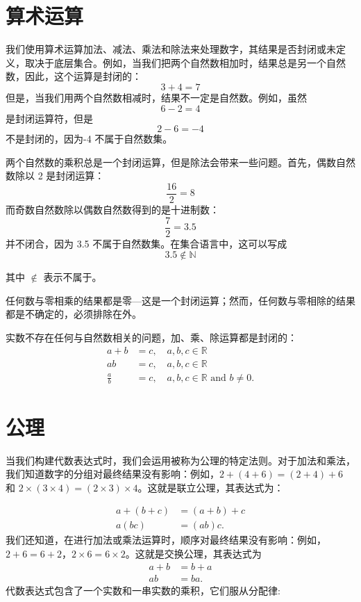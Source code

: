 \section{算术运算}
我们使用算术运算加法、减法、乘法和除法来处理数字，其结果是否封闭或未定义，取决于底层集合。例如，当我们把两个自然数相加时，结果总是另一个自然数，因此，这个运算是封闭的：
$$
    3+4=7
$$
但是，当我们用两个自然数相减时，结果不一定是自然数。例如，虽然
$$
    6-2=4
$$
是封闭运算符，但是
$$
    2-6=-4
$$
不是封闭的，因为-4 不属于自然数集。

两个自然数的乘积总是一个封闭运算，但是除法会带来一些问题。首先，偶数自然数除以 2 是封闭运算：
$$
    \frac{16}{2}=8
$$
而奇数自然数除以偶数自然数得到的是十进制数：
$$
    \frac{7}{2}=3.5
$$
并不闭合，因为 3.5 不属于自然数集。在集合语言中，这可以写成
$$
    3.5 \notin \mathbb{N}
$$

其中 $\notin$ 表示不属于。

任何数与零相乘的结果都是零---这是一个封闭运算；然而，任何数与零相除的结果都是不确定的，必须排除在外。

实数不存在任何与自然数相关的问题，加、乘、除运算都是封闭的：
$$
    \begin{aligned}
        a+b         & =c, \quad a, b, c \in \mathbb{R}                          \\
        a b         & =c, \quad a, b, c \in \mathbb{R}                          \\
        \frac{a}{b} & =c, \quad a, b, c \in \mathbb{R} \text { and } b \neq 0 .
    \end{aligned}
$$

\section{公理}
当我们构建代数表达式时，我们会运用被称为公理的特定法则。对于加法和乘法，我们知道数字的分组对最终结果没有影响：例如，$2+(4+6)=(2+4)+6$ 和 $2 \times(3 \times 4)=(2\times  3)\times 4$。这就是联立公理，其表达式为：

$$
    \begin{aligned}
        a+(b+c) & =(a+b)+c   \\
        a(b c)  & =(a b) c .
    \end{aligned}
$$
我们还知道，在进行加法或乘法运算时，顺序对最终结果没有影响：例如，$2+6=6+2$，$2 \times 6=6 \times 2$。这就是交换公理，其表达式为
$$
    \begin{aligned}
        a+b & =b+a   \\
        a b & =b a .
    \end{aligned}
$$
代数表达式包含了一个实数和一串实数的乘积，它们服从分配律:

